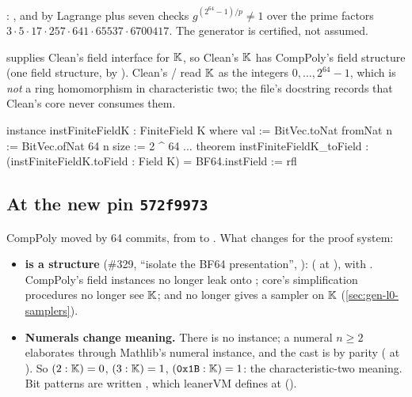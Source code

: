 
\allowbreak{}\allowbreak{}: , and
\allowbreak{} by Lagrange plus seven  checks
$g^{(2^{64}-1)/p} \neq 1$ over the prime factors $3 \cdot 5 \cdot 17 \cdot 257 \cdot 641 \cdot
65537 \cdot 6700417$. The generator is certified, not assumed.

\allowbreak{}\allowbreak{} supplies Clean's field interface for $\mathbb{K}$, so
Clean's $\mathbb{K}$ has CompPoly's field structure (one field structure, by ). Clean's
/ read $\mathbb{K}$ as the integers $0, \dots, 2^{64}-1$, which is \emph{not} a
ring homomorphism in characteristic two; the file's docstring records that Clean's core never
consumes them.

\begin{leancode}
instance instFiniteFieldK : FiniteField K where
  val := BitVec.toNat
  fromNat n := BitVec.ofNat 64 n
  size := 2 ^ 64
  ...
theorem instFiniteFieldK_toField : (instFiniteFieldK.toField : Field K) = BF64.instField := rfl
\end{leancode}


\subsection{At the new pin \texorpdfstring{\texttt{572f9973}}{572f9973}}\label{sec:gen-lib-comppoly-new}

CompPoly moved by 64 commits, from  to . What changes for the proof
system:
\begin{itemize}
\item \textbf{ is a structure} (\#329, \enquote{isolate the BF64 presentation},
  ): 
  (\allowbreak{}\allowbreak{}\allowbreak{}\allowbreak{} at ), with .
  CompPoly's field instances no longer leak onto ; core's 
  simplification procedures no longer see $\mathbb{K}$; and  no longer gives a
  sampler on $\mathbb{K}$ (\cref{sec:gen-l0-samplers}).
\item \textbf{Numerals change meaning.} There is no  instance; a numeral
  $n \geq 2$ elaborates through Mathlib's  numeral instance, and the cast is by
  parity ( at ). So $(2 : \mathbb{K}) = 0$, $(3 : \mathbb{K}) = 1$,
  $(\mathtt{0x1B} : \mathbb{K}) = 1$: the characteristic-two meaning. Bit patterns are written
  , which leanerVM defines at 
  (\allowbreak{}\allowbreak{}).
\end{itemize}

